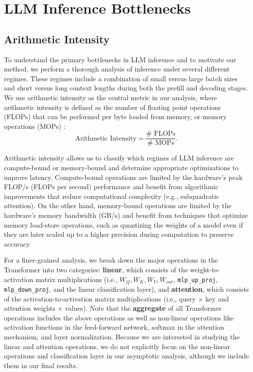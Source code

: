 \section{LLM Inference Bottlenecks}

\subsection{Arithmetic Intensity}
\label{sec:multi-regime-analysis-inference-bottlenecks}
To understand the primary bottlenecks in LLM inference and to motivate our method, we perform a thorough analysis of inference under several different regimes. These regimes include a combination of small versus large batch sizes and short versus long context lengths during both the prefill and decoding stages. We use arithmetic intensity as the central metric in our analysis, where arithmetic intensity is defined as the number of floating point operations (FLOPs) that can be performed per byte loaded from memory, or memory operations (MOPs) \cite{williams2009roofline}:
\[\text{Arithmetic Intensity} = \frac{\#\text{ FLOPs}}{\#\text{ MOPs}}.\] 

Arithmetic intensity allows us to classify which regimes of LLM inference are compute-bound or memory-bound and determine appropriate optimizations to improve latency. Compute-bound operations are limited by the hardware's peak FLOP/s (FLOPs per second) performance and benefit from algorithmic improvements that reduce computational complexity (e.g., subquadratic attention).
On the other hand, memory-bound operations are limited by the hardware's memory bandwidth (GB/s) and benefit from techniques that optimize memory load-store operations, such as quantizing the weights of a model even if they are later scaled up to a higher precision during computation to preserve accuracy.

For a finer-grained analysis, we break down the major operations in the Transformer into two categories: \textbf{linear}, which consists of the weight-to-activation matrix multiplications (i.e., $W_Q, W_K, W_V, W_{out}$, \texttt{mlp\_up\_proj}, \texttt{mlp\_down\_proj}, and the linear classification layer), and \textbf{attention}, which consists of the activation-to-activation matrix multiplications (i.e., query $\times$ key and attention weights $\times$ values). Note that the \textbf{aggregate} of all Transformer operations includes the above operations as well as non-linear operations like activation functions in the feed-forward network, softmax in the attention mechanism, and layer normalization. Because we are interested in studying the linear and attention operations, we do not explicitly focus on the non-linear operations and classification layer in our asymptotic analysis, although we include them in our final results.

